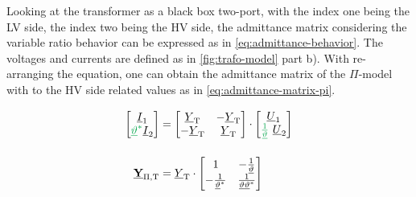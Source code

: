 Looking at the transformer as a black box two-port, with the index one being the \ac{LV} side, the index two being the \ac{HV} side, the admittance matrix considering the variable ratio behavior can be expressed as in \autoref{eq:admittance-behavior}. 
The voltages and currents are defined as in \autoref{fig:trafo-model} part b). 
With re-arranging the equation, one can obtain the admittance matrix of the $\Pi$-model with to the \acs{HV} side related values as in \autoref{eq:admittance-matrix-pi}. \autocite{milano_2010,burlakin_2024}

\begin{align}
    \begin{bmatrix}
        \underline{I}_1 \\ {\color{ees_green}\underline{\vartheta}^*} \underline{I}_2
    \end{bmatrix}&= 
    \begin{bmatrix}
        \underline{Y}_\mathrm{T} & -\underline{Y}_\mathrm{T} \\
        -\underline{Y}_\mathrm{T} & \underline{Y}_\mathrm{T}
    \end{bmatrix} \cdot
    \begin{bmatrix}
        \underline{U}_1 \\ {\color{ees_green}\frac{1}{\underline{\vartheta}}}~\underline{U}_2
    \end{bmatrix} \label{eq:admittance-behavior} \\[12pt]
    \underline{\mab{Y}}_\mathrm{\Pi,T}&=\underline{Y}_\mathrm{T} \cdot
    \begin{bmatrix}
        1 & -\frac{1}{\underline{\vartheta}} \\
        -\frac{1}{\underline{\vartheta}^*} & \frac{1}{\underline{\vartheta}\underline{\vartheta}^*} 
    \end{bmatrix} \label{eq:admittance-matrix-pi}
\end{align}

